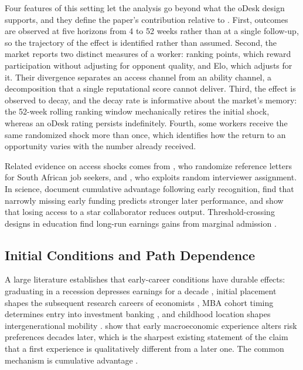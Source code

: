 Four features of this setting let the analysis go beyond what the oDesk design supports, and they define the paper's contribution relative to \citet{Pallais2014_inefficient_hiring}. First, outcomes are observed at five horizons from 4 to 52 weeks rather than at a single follow-up, so the trajectory of the effect is identified rather than assumed. Second, the market reports two distinct measures of a worker: ranking points, which reward participation without adjusting for opponent quality, and Elo, which adjusts for it. Their divergence separates an access channel from an ability channel, a decomposition that a single reputational score cannot deliver. Third, the effect is observed to decay, and the decay rate is informative about the market's memory: the 52-week rolling ranking window mechanically retires the initial shock, whereas an oDesk rating persists indefinitely. Fourth, some workers receive the same randomized shock more than once, which identifies how the return to an opportunity varies with the number already received.

Related evidence on access shocks comes from \citet{Abel2020_reference_letters}, who randomize reference letters for South African job seekers, and \citet{Startz2021_interviewer_effects}, who exploits random interviewer assignment. In science, \citet{Azoulay2014_matthew_effect} document cumulative advantage following early recognition, \citet{Wang2019_early_career_setback} find that narrowly missing early funding predicts stronger later performance, and \citet{Azoulay2010_superstar_extinction} show that losing access to a star collaborator reduces output. Threshold-crossing designs in education find long-run earnings gains from marginal admission \citep{Zimmerman2014_college_marginal, Hoekstra2009_flagship_earnings, Goodman2017_college_access}.

\subsection{Initial Conditions and Path Dependence}
\label{sec:lit_initial}

A large literature establishes that early-career conditions have durable effects: graduating in a recession depresses earnings for a decade \citep{Oreopoulos2012_graduating_recession}, initial placement shapes the subsequent research careers of economists \citep{Oyer2006_initial_placement}, MBA cohort timing determines entry into investment banking \citep{Oyer2008_investment_banker}, and childhood location shapes intergenerational mobility \citep{Chetty2014_where_is_land}. \citet{Malmendier2011_depression_babies} show that early macroeconomic experience alters risk preferences decades later, which is the sharpest existing statement of the claim that a first experience is qualitatively different from a later one. The common mechanism is cumulative advantage \citep{Merton1968_matthew_effect, Rosen1981_superstars}.

